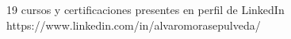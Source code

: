 


\begin{cventries}

  \cventry
    {19 cursos y certificaciones presentes en perfil de LinkedIn \newline
    https://www.linkedin.com/in/alvaromorasepulveda/} %
    {} %
    {} %
    {} %
    {}

\end{cventries}
